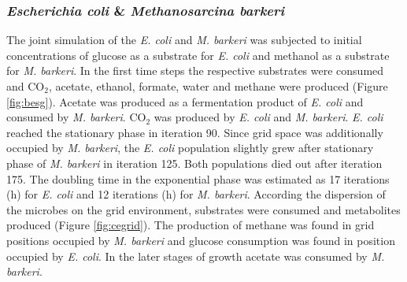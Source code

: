 \subsubsection{\textit{Escherichia coli} \& \textit{Methanosarcina barkeri}}
The joint simulation of the \textit{E. coli} and \textit{M. barkeri} was subjected to initial concentrations of glucose as a substrate for \textit{E. coli} and methanol as a substrate for \textit{M. barkeri}. In the first time steps the respective substrates were consumed and CO$_2$, acetate, ethanol, formate, water and methane were produced (Figure \hyperref[fig:besg]{\ref{fig:besg}}). Acetate was produced as a fermentation product of \textit{E. coli} and consumed by \textit{M. barkeri}. CO$_2$ was produced by \textit{E. coli} and \textit{M. barkeri}. \textit{E. coli} reached the stationary phase in iteration 90.
Since grid space was additionally occupied by \textit{M. barkeri}, the \textit{E. coli} population slightly grew after stationary phase of \textit{M. barkeri} in iteration 125. Both populations died out after iteration 175.
The doubling time in the exponential phase was estimated as 17 iterations (h) for \textit{E. coli} and 12 iterations (h) for \textit{M. barkeri}.
According the dispersion of the microbes on the grid environment, substrates were consumed and metabolites produced (Figure \hyperref[fig:cegrid]{\ref{fig:cegrid}}). The production of methane was found in grid positions occupied by \textit{M. barkeri} and glucose consumption was found in position occupied by \textit{E. coli}. In the later stages of growth acetate was consumed by \textit{M. barkeri}.
